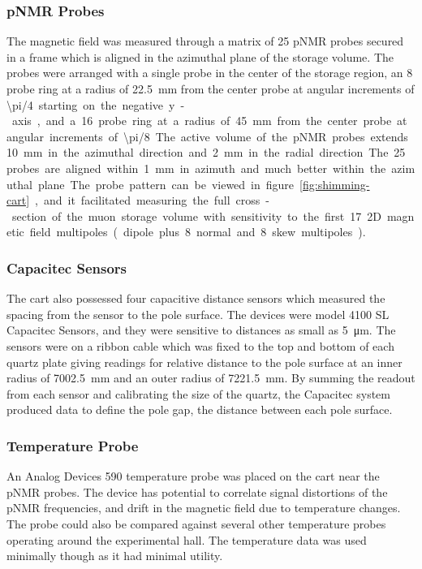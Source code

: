 \subsubsection{pNMR Probes}
The magnetic field was measured through a matrix of 25 pNMR probes secured in a frame which is aligned in the azimuthal plane of the storage volume.  The probes were arranged with a single probe in the center of the storage region, an 8 probe ring at a radius of \SI{22.5}{\mm} from the center probe at angular increments of \SI{\pi/4} starting on the negative y-axis, and a 16 probe ring at a radius of \SI{45}{\mm} from the center probe at angular increments of \SI{\pi/8}.  The active volume of the pNMR probes extends \SI{10}{\mm} in the azimuthal direction and \SI{2}{\mm} in the radial direction.  The 25 probes are aligned within \SI{1}{\mm} in azimuth and much better within the azimuthal plane.  The probe pattern can be viewed in figure \ref{fig:shimming-cart}, and it facilitated measuring the full cross-section of the muon storage volume with sensitivity to the first 17 2D magnetic field multipoles (dipole plus 8 normal and 8 skew multipoles).

\subsubsection{Capacitec Sensors}
The cart also possessed four capacitive distance sensors which measured the spacing from the sensor to the pole surface.  The devices were model 4100 SL Capacitec Sensors, and they were sensitive to distances as small as \SI{5}{\micro \meter}.   The sensors were on a ribbon cable which was fixed to the top and bottom of each quartz plate giving readings for relative distance to the pole surface at an inner radius of \SI{7002.5}{\mm} and an outer radius of \SI{7221.5}{\mm}.  By summing the readout from each sensor and calibrating the size of the quartz, the Capacitec system produced data to define the pole gap, the distance between each pole surface.

\subsubsection{Temperature Probe}
An Analog Devices 590 temperature probe was placed on the cart near the pNMR probes. The device has potential to correlate signal distortions of the pNMR frequencies, and drift in the magnetic field due to temperature changes.  The probe could also be compared against several other temperature probes operating around the experimental hall.  The temperature data was used minimally though as it had minimal utility.

